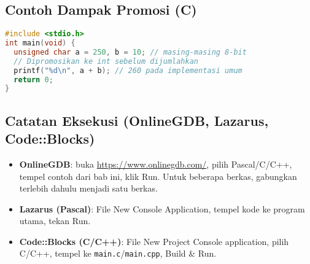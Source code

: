 \documentclass[../main.tex]{subfiles}
\begin{document}
\subsection{Contoh Dampak Promosi (C)}
\begin{lstlisting}[language=C, caption={Promosi integral memengaruhi hasil di C}]
#include <stdio.h>
int main(void) {
  unsigned char a = 250, b = 10; // masing-masing 8-bit
  // Dipromosikan ke int sebelum dijumlahkan
  printf("%d\n", a + b); // 260 pada implementasi umum
  return 0;
}
\end{lstlisting}

\subsection{Catatan Eksekusi (OnlineGDB, Lazarus, Code::Blocks)}
\begin{itemize}
  \item \textbf{OnlineGDB}: buka \url{https://www.onlinegdb.com/}, pilih Pascal/C/C++, tempel contoh dari bab ini, klik Run. Untuk beberapa berkas, gabungkan terlebih dahulu menjadi satu berkas.
  \item \textbf{Lazarus (Pascal)}: File \textrightarrow{} New \textrightarrow{} Console Application, tempel kode ke program utama, tekan Run.
  \item \textbf{Code::Blocks (C/C++)}: File \textrightarrow{} New \textrightarrow{} Project \textrightarrow{} Console application, pilih C/C++, tempel ke \texttt{main.c}/\texttt{main.cpp}, Build \& Run.
\end{itemize}
\end{document}
